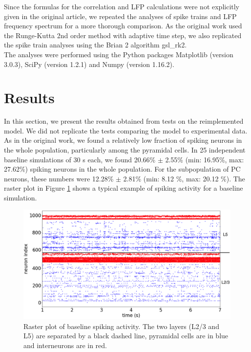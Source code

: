Since the formulas for the correlation and LFP calculations were not explicitly given in the original article, we repeated the analyses of spike trains and LFP frequency spectrum for a more thorough comparison. As the original work used the Runge-Kutta 2nd order method with adaptive time step, we also replicated the spike train analyses using the Brian 2 algorithm gsl\_rk2.\\

The analyses were performed using the Python packages Matplotlib (version 3.0.3), SciPy (version 1.2.1) and Numpy (version 1.16.2).\\

\section*{Results}

In this section, we present the results obtained from tests on the reimplemented model. We did not replicate the tests comparing the model to experimental data.\\

As in the original work, we found a relatively low fraction of spiking neurons in the whole population, particularly among the pyramidal cells. In 25 independent baseline simulations of 30 s each, we found 20.66\% $\pm$ 2.55\% (min: 16.95\%, max: 27.62\%) spiking neurons in the whole population. For the subpopulation of PC neurons, these numbers were 12.28\% $\pm$ 2.81\% (min: 8.12 \%, max: 20.12 \%). The raster plot in Figure \ref{fig:fig1} shows a typical example of spiking activity for a baseline simulation.  \\

\begin{figure}[H]
    
    \includegraphics[scale=0.30]{Figures/Fig1.png}
    \caption{Raster plot of baseline spiking activity. The two layers (L2/3 and L5) are separated by a black dashed line, pyramidal cells are in blue and interneurons are in red.}
    \label{fig:fig1}
\end{figure}

